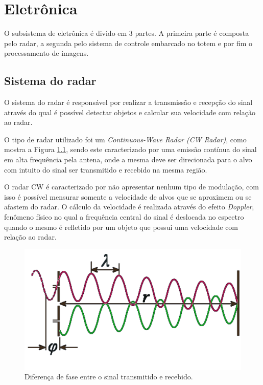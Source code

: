 \chapter{Eletrônica}

O subsistema de eletrônica é divido em 3 partes. A primeira parte é composta pelo radar, a segunda pelo sistema de controle embarcado no totem e por fim o processamento de imagens. 


\section{Sistema do radar}
O sistema do radar é responsável por realizar a transmissão e recepção do sinal através do qual é possível detectar objetos e calcular sua velocidade com relação ao radar.

O tipo de radar utilizado foi um \textit{Continuous-Wave Radar (CW Radar)}, como mostra a Figura \ref{Doppler1}, sendo este caracterizado por uma emissão contínua do sinal em alta frequência pela antena, onde a mesma deve ser direcionada para o alvo com intuito do sinal ser transmitido e recebido na mesma região. 

O radar CW é caracterizado por não apresentar nenhum tipo de modulação, com isso é possível mensurar somente a velocidade de alvos que se aproximem ou se afastem do radar. O cálculo da velocidade é realizada através do efeito  \emph{Doppler}, fenômeno físico no qual a frequência central do sinal é deslocada no espectro quando o mesmo é refletido por um objeto que possui uma velocidade com relação ao radar. 
\begin{figure}[H]
    \centering
   \includegraphics[scale = 0.25]{figuras/Doppler2.pdf}
   \caption{Diferença de fase entre o sinal transmitido e recebido.}
   \label{Doppler1}
    \end{figure}

